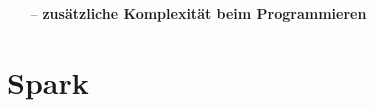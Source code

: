 \begin{frame}
\begin{itemize}
        \item[–] \textbf{zusätzliche Komplexität beim Programmieren}
    \end{itemize}
\end{frame}



\section{Spark}


